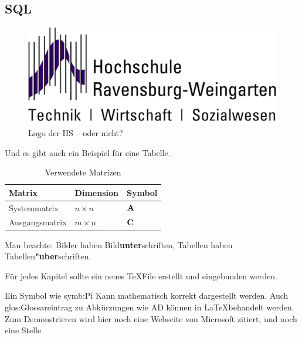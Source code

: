 \subsection{SQL}

\FloatBarrier
\begin{figure}
 \begin{center}
  \includegraphics*{bilder/HSLogoWGd}
  \caption{Logo der HS -- oder nicht?}
  \label{fig:logo}
 \end{center}
\end{figure}

Und es gibt auch ein Beispiel für eine Tabelle.

\begin{table}
 \begin{center}
 \caption{Verwendete Matrizen}
 \label{matrizen}
  \begin{tabular}{|l|l|l|}
   \hline
   Matrix & Dimension & Symbol \\
   \hline
   Systemmatrix & $n \times n$ & ${\bf A}$  \\
   \hline
   Ausgangsmatrix & $m \times n$ & ${\bf C}$  \\
   \hline
  \end{tabular}
 \end{center}
\end{table}
\FloatBarrier
Man beachte: Bilder haben Bild{\bf unter}schriften, 
Tabellen haben Tabellen{\bf "uber}schriften.

Für jedes Kapitel sollte ein neues \TeX  File erstellt und eingebunden werden. \newline

Ein Symbol wie \gls{symb:Pi} Kann mathematisch korrekt dargestellt werden. Auch \gls{glos:Glossareintrag} zu Abkürzungen wie \gls{AD} können in \LaTeX behandelt werden.
Zum Demonstrieren wird hier noch eine Webseite von Microsoft zitiert\cite{SE}, und noch eine Stelle\cite{SE}


 
